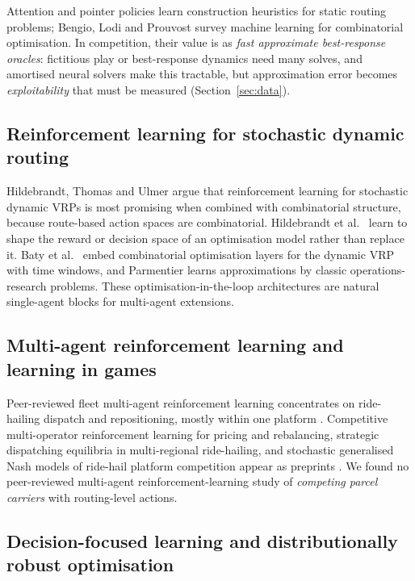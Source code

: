 \documentclass[preprint,12pt]{elsarticle}
\begin{document}
Attention and pointer policies \cite{Vinyals2015,Nazari2018,Kool2019,Kwon2020} learn construction heuristics for static routing problems; Bengio, Lodi and Prouvost \cite{Bengio2021} survey machine learning for combinatorial optimisation. In competition, their value is as \emph{fast approximate best-response oracles}: fictitious play or best-response dynamics need many solves, and amortised neural solvers make this tractable, but approximation error becomes \emph{exploitability} that must be measured (Section~\ref{sec:data}).

\subsection{Reinforcement learning for stochastic dynamic routing}

Hildebrandt, Thomas and Ulmer \cite{Hildebrandt2023} argue that reinforcement learning for stochastic dynamic VRPs is most promising when combined with combinatorial structure, because route-based action spaces are combinatorial. Hildebrandt et al.\ \cite{Hildebrandt2026} learn to shape the reward or decision space of an optimisation model rather than replace it. Baty et al.\ \cite{Baty2024} embed combinatorial optimisation layers for the dynamic VRP with time windows, and Parmentier \cite{Parmentier2022} learns approximations by classic operations-research problems. These optimisation-in-the-loop architectures are natural single-agent blocks for multi-agent extensions.

\subsection{Multi-agent reinforcement learning and learning in games}

Peer-reviewed fleet multi-agent reinforcement learning concentrates on ride-hailing dispatch and repositioning, mostly within one platform \cite{Li2019}. Competitive multi-operator reinforcement learning for pricing and rebalancing, strategic dispatching equilibria in multi-regional ride-hailing, and stochastic generalised Nash models of ride-hail platform competition appear as preprints \cite{Toft2026,Chen2026prep,Fabiani2022}. We found no peer-reviewed multi-agent reinforcement-learning study of \emph{competing parcel carriers} with routing-level actions.

\subsection{Decision-focused learning and distributionally robust optimisation}
\end{document}
